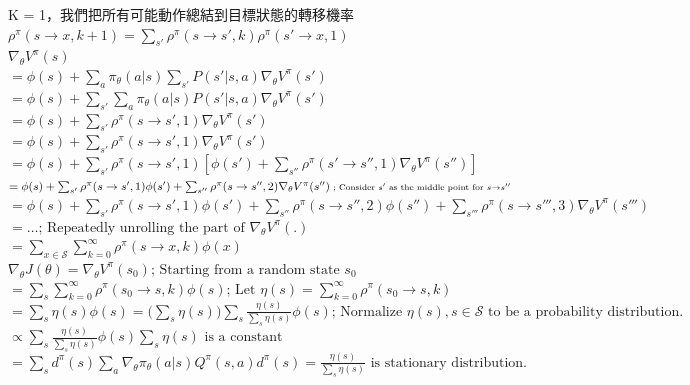 \documentclass[14pt,a4paper]{report}  %
\begin{document}
K = 1，我們把所有可能動作總結到目標狀態的轉移機率$\rho^\pi(s \to x, k+1) = \sum_{s'} \rho^\pi(s \to s', k) \rho^\pi(s' \to x, 1)$\\[5pt]
$ {\nabla_\theta V^\pi(s)} $\\[5pt]
$= \phi(s) + \sum_a \pi_\theta(a \vert s) \sum_{s'} P(s' \vert s,a) {\nabla_\theta V^\pi(s')}$ \\[5pt]
$= \phi(s) + \sum_{s'} \sum_a \pi_\theta(a \vert s) P(s' \vert s,a) {\nabla_\theta V^\pi(s')}$ \\[5pt]
$=\phi(s) + \sum_{s'} \rho^\pi(s \to s', 1) {\nabla_\theta V^\pi(s')}$ \\[5pt]
$= \phi(s) + \sum_{s'} \rho^\pi(s \to s', 1) {\nabla_\theta V^\pi(s')}$ \\[5pt]
$= \phi(s) + \sum_{s'} \rho^\pi(s \to s', 1){[ \phi(s') + \sum_{s''} \rho^\pi(s' \to s'', 1) \nabla_\theta V^\pi(s'')]}$ \\[5pt]
$= \phi(s) + \sum_{s'} \rho^\pi(s \to s', 1) \phi(s') + \sum_{s''} \rho^\pi(s \to s'', 2){\nabla_\theta V^\pi(s'')} \\
\scriptstyle{\text{ ; Consider }s'\text{ as the middle point for }s \to s''}$\\[5pt]
$= \phi(s) + \sum_{s'} \rho^\pi(s \to s', 1) \phi(s') + \sum_{s''} \rho^\pi(s \to s'', 2)\phi(s'') + \sum_{s'''} \rho^\pi(s \to s''', 3){\nabla_\theta V^\pi(s''')}$ \\[5pt]
$= \dots \scriptstyle{\text{; Repeatedly unrolling the part of }\nabla_\theta V^\pi(.)}$ \\[5pt]
$= \sum_{x\in\mathcal{S}}\sum_{k=0}^\infty \rho^\pi(s \to x, k) \phi(x)$
$\nabla_\theta J(\theta)
= \nabla_\theta V^\pi(s_0)  \scriptstyle{\text{; Starting from a random state } s_0} $\\[5pt]
$= \sum_{s}{\sum_{k=0}^\infty \rho^\pi(s_0 \to s, k)} \phi(s) \scriptstyle{\text{; Let }{\eta(s) = \sum_{k=0}^\infty \rho^\pi(s_0 \to s, k)}} $\\[5pt]
$= \sum_{s}\eta(s) \phi(s) 
= \Big( {\sum_s \eta(s)} \Big)\sum_{s}\frac{\eta(s)}{\sum_s \eta(s)} \phi(s)  
\scriptstyle{\text{; Normalize } \eta(s), s\in\mathcal{S} \text{ to be a probability distribution.}}$\\[5pt]
$\propto \sum_s \frac{\eta(s)}{\sum_s \eta(s)} \phi(s)  \scriptstyle{\sum_s \eta(s)\text{  is a constant}}$ \\[5pt]
$= \sum_s d^\pi(s) \sum_a \nabla_\theta \pi_\theta(a \vert s)Q^\pi(s, a)  \scriptstyle{d^\pi(s) = \frac{\eta(s)}{\sum_s \eta(s)}\text{ is stationary distribution.}}$
\end{document}
